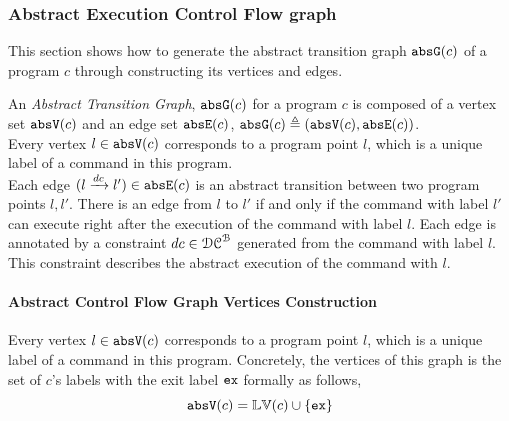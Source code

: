 \subsubsection{Abstract Execution Control Flow graph}
\label{sec:abscfg}
This section shows how to generate the abstract transition graph $\mathtt{abs}{\mathtt{G}}(c)$ of a
program $c$ through constructing its vertices and edges.

An \emph{Abstract Transition Graph}, $\mathtt{abs}{\mathtt{G}}(c)$ for a program $c$ is composed of
a vertex set $\mathtt{abs}{\mathtt{V}}(c)$ and an edge set $\mathtt{abs}{\mathtt{E}}(c)$, $\mathtt{abs}{\mathtt{G}}(c) \triangleq (\mathtt{abs}{\mathtt{V}}(c), \mathtt{abs}{\mathtt{E}}(c))$.
%
\\
Every 
vertex $l \in \mathtt{abs}{\mathtt{V}}(c)$ corresponds to a program point $l$, which is a unique
label of a command in this program.
\\
Each edge $(l \xrightarrow{dc} l') \in \mathtt{abs}{\mathtt{E}}(c)$ is an abstract transition
between two program points $l, l'$. 
There is an edge from $l$ to $l'$ if and only if
the command with label $l'$ can execute right after the execution of the command with label $l$.
Each edge is annotated by a constraint $dc \in \mathcal{DC}^{\mathcal{B}}$ generated from the command with label $l$.
This constraint describes the abstract execution of the command with $l$. 

\paragraph{Abstract Control Flow Graph Vertices Construction}
\label{sec:abscfg-vertex}
Every 
vertex $l \in \mathtt{abs}{\mathtt{V}}(c)$ corresponds to a program point $l$, which is a unique
label of a command in this program.
Concretely,
the vertices of this graph is the set of $c$'s labels with the exit label ${\mathtt{ex}}$ formally as follows,
\[ 
  \mathtt{abs}{\mathtt{V}}(c) = \mathbb{LV}(c)\cup\{{\mathtt{ex}}\}
\]

